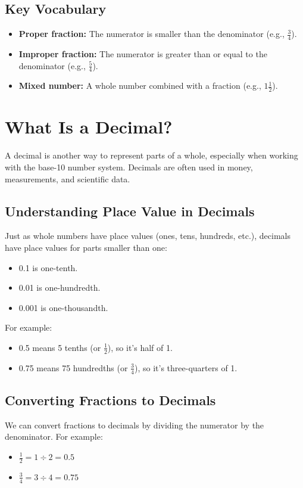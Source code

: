\subsection{Key Vocabulary}
\begin{itemize}
    \item \textbf{Proper fraction:} The numerator is smaller than the denominator (e.g., $\frac{3}{4}$).
    \item \textbf{Improper fraction:} The numerator is greater than or equal to the denominator (e.g., $\frac{5}{4}$).
    \item \textbf{Mixed number:} A whole number combined with a fraction (e.g., $1 \frac{1}{2}$).
\end{itemize}

\section{What Is a Decimal?}
A decimal is another way to represent parts of a whole, especially when working with the base-10 number system. Decimals are often used in money, measurements, and scientific data.

\subsection{Understanding Place Value in Decimals}
Just as whole numbers have place values (ones, tens, hundreds, etc.), decimals have place values for parts smaller than one:
\begin{itemize}
    \item 0.1 is one-tenth.
    \item 0.01 is one-hundredth.
    \item 0.001 is one-thousandth.
\end{itemize}

For example:
\begin{itemize}
    \item 0.5 means 5 tenths (or $\frac{1}{2}$), so it’s half of 1.
    \item 0.75 means 75 hundredths (or $\frac{3}{4}$), so it’s three-quarters of 1.
\end{itemize}

\subsection{Converting Fractions to Decimals}
We can convert fractions to decimals by dividing the numerator by the denominator. For example:
\begin{itemize}
    \item $\frac{1}{2} = 1 \div 2 = 0.5$
    \item $\frac{3}{4} = 3 \div 4 = 0.75$
\end{itemize}

